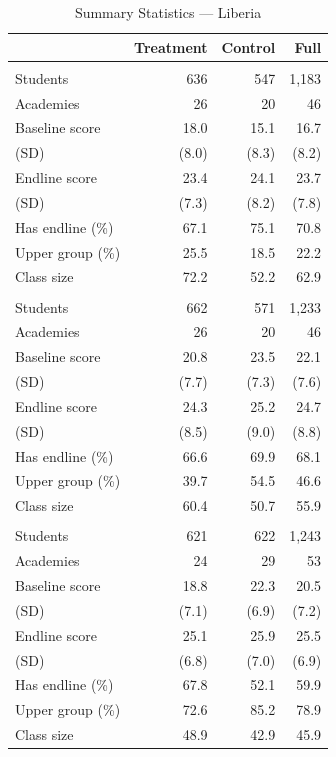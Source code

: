 \begin{table}[htbp]
\centering
\small
\caption{Summary Statistics --- Liberia}
\label{tab:lib_sumstats}
\begin{tabular}{l*{3}{r}}
\toprule
 & Treatment & Control & Full \\
\midrule
\addlinespace
\multicolumn{4}{l}{\textit{Grade 1}} \\
Students & 636 & 547 & 1,183 \\
Academies & 26 & 20 & 46 \\
Baseline score & 18.0 & 15.1 & 16.7 \\
\quad (SD) & (8.0) & (8.3) & (8.2) \\
Endline score & 23.4 & 24.1 & 23.7 \\
\quad (SD) & (7.3) & (8.2) & (7.8) \\
Has endline (\%) & 67.1 & 75.1 & 70.8 \\
Upper group (\%) & 25.5 & 18.5 & 22.2 \\
Class size & 72.2 & 52.2 & 62.9 \\
\addlinespace
\multicolumn{4}{l}{\textit{Grade 2}} \\
Students & 662 & 571 & 1,233 \\
Academies & 26 & 20 & 46 \\
Baseline score & 20.8 & 23.5 & 22.1 \\
\quad (SD) & (7.7) & (7.3) & (7.6) \\
Endline score & 24.3 & 25.2 & 24.7 \\
\quad (SD) & (8.5) & (9.0) & (8.8) \\
Has endline (\%) & 66.6 & 69.9 & 68.1 \\
Upper group (\%) & 39.7 & 54.5 & 46.6 \\
Class size & 60.4 & 50.7 & 55.9 \\
\addlinespace
\multicolumn{4}{l}{\textit{Grade 3}} \\
Students & 621 & 622 & 1,243 \\
Academies & 24 & 29 & 53 \\
Baseline score & 18.8 & 22.3 & 20.5 \\
\quad (SD) & (7.1) & (6.9) & (7.2) \\
Endline score & 25.1 & 25.9 & 25.5 \\
\quad (SD) & (6.8) & (7.0) & (6.9) \\
Has endline (\%) & 67.8 & 52.1 & 59.9 \\
Upper group (\%) & 72.6 & 85.2 & 78.9 \\
Class size & 48.9 & 42.9 & 45.9 \\

\end{tabular}
\end{table}
